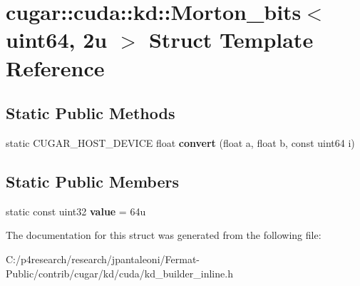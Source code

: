\hypertarget{structcugar_1_1cuda_1_1kd_1_1_morton__bits_3_01uint64_00_012u_01_4}{}\section{cugar\+:\+:cuda\+:\+:kd\+:\+:Morton\+\_\+bits$<$ uint64, 2u $>$ Struct Template Reference}
\label{structcugar_1_1cuda_1_1kd_1_1_morton__bits_3_01uint64_00_012u_01_4}
\subsection*{Static Public Methods}
\begin{DoxyCompactItemize}
\item 
\mbox{\label{structcugar_1_1cuda_1_1kd_1_1_morton__bits_3_01uint64_00_012u_01_4_a28aa85bc17c670568b4da3a71c195e74}} 
static C\+U\+G\+A\+R\+\_\+\+H\+O\+S\+T\+\_\+\+D\+E\+V\+I\+CE float {\bfseries convert} (float a, float b, const uint64 i)
\end{DoxyCompactItemize}
\subsection*{Static Public Members}
\begin{DoxyCompactItemize}
\item 
\mbox{\label{structcugar_1_1cuda_1_1kd_1_1_morton__bits_3_01uint64_00_012u_01_4_ac8a07728926aff2df01122688e8a67b8}} 
static const uint32 {\bfseries value} = 64u
\end{DoxyCompactItemize}


The documentation for this struct was generated from the following file\+:\begin{DoxyCompactItemize}
\item 
C\+:/p4research/research/jpantaleoni/\+Fermat-\/\+Public/contrib/cugar/kd/cuda/kd\+\_\+builder\+\_\+inline.\+h\end{DoxyCompactItemize}
